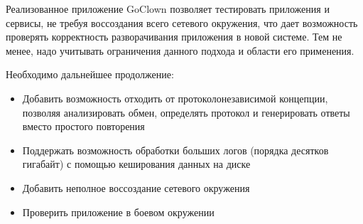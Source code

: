 Реализованное приложение GoClown позволяет тестировать приложения и сервисы,
не требуя воссоздания всего сетевого окружения, что дает возможность проверять
корректность разворачивания приложения в новой системе. Тем не менее, надо
учитывать ограничения данного подхода и области его применения.

Необходимо дальнейшее продолжение:
\begin{itemize}
\item Добавить возможность отходить от протоколонезависимой концепции, позволяя
анализировать обмен, определять протокол и генерировать ответы вместо простого
повторения  
\item Поддержать возможность обработки больших логов (порядка десятков
гигабайт) с помощью кеширования данных на диске  
\item Добавить неполное воссоздание сетевого окружения  
\item Проверить приложение в боевом окружении  
\end{itemize}

